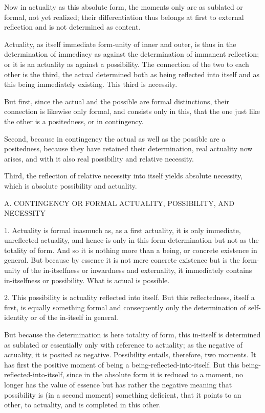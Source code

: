 Now in actuality as this absolute form,
the moments only are as sublated or formal, not yet realized;
their differentiation thus belongs at first to external reflection
and is not determined as content.

Actuality, as itself immediate form-unity of inner and outer,
is thus in the determination of immediacy
as against the determination of immanent reflection;
or it is an actuality as against a possibility.
The connection of the two to each other is the third,
the actual determined both as being reflected into itself
and as this being immediately existing.
This third is necessity.

But first, since the actual and the possible are formal distinctions,
their connection is likewise only formal, and consists only in this,
that the one just like the other is a positedness, or in contingency.

Second, because in contingency the actual
as well as the possible are a positedness,
because they have retained their determination,
real actuality now arises,
and with it also real possibility
and relative necessity.

Third, the reflection of relative necessity
into itself yields absolute necessity,
which is absolute possibility and actuality.

A. CONTINGENCY OR FORMAL ACTUALITY, POSSIBILITY, AND NECESSITY

1. Actuality is formal inasmuch as, as a first actuality,
it is only immediate, unreflected actuality,
and hence is only in this form determination
but not as the totality of form.
And so it is nothing more than a being,
or concrete existence in general.
But because by essence it is not mere concrete existence
but is the form-unity of the in-itselfness
or inwardness and externality,
it immediately contains in-itselfness or possibility.
What is actual is possible.

2. This possibility is actuality reflected into itself.
But this reflectedness, itself a first, is equally something formal
and consequently only the determination of self-identity
or of the in-itself in general.

But because the determination is here totality of form,
this in-itself is determined as sublated
or essentially only with reference to actuality;
as the negative of actuality, it is posited as negative.
Possibility entails, therefore, two moments.
It has first the positive moment
of being a being-reflected-into-itself.
But this being-reflected-into-itself,
since in the absolute form it is reduced to a moment,
no longer has the value of essence but has rather
the negative meaning that possibility is (in a second moment)
something deficient, that it points to an other, to actuality,
and is completed in this other.

